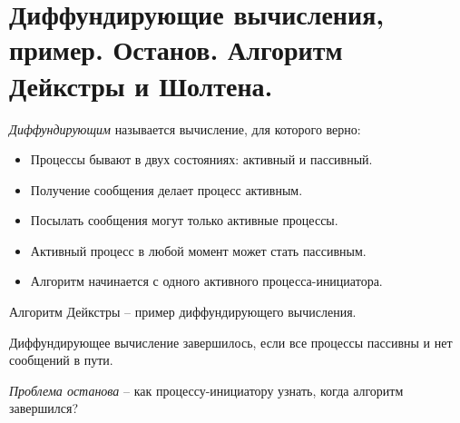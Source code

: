 \section{Диффундирующие вычисления, пример. Останов. Алгоритм Дейкстры и Шолтена.}

\begin{definition}
    \textit{Диффундирующим} называется вычисление, для которого верно:
    \begin{itemize}
        \item Процессы бывают в двух состояниях: активный и пассивный.
        \item Получение сообщения делает процесс активным.
        \item Посылать сообщения могут только активные процессы.
        \item Активный процесс в любой момент может стать пассивным.
        \item Алгоритм начинается с одного активного процесса-инициатора.
    \end{itemize}
\end{definition}

\begin{example}
    Алгоритм Дейкстры -- пример диффундирующего вычисления.
\end{example}

\begin{definition}
    Диффундирующее вычисление завершилось, если все процессы пассивны и нет
    сообщений в пути.
\end{definition}

\begin{definition}
    \textit{Проблема останова} -- как процессу-инициатору узнать, когда
    алгоритм завершился?
\end{definition}

